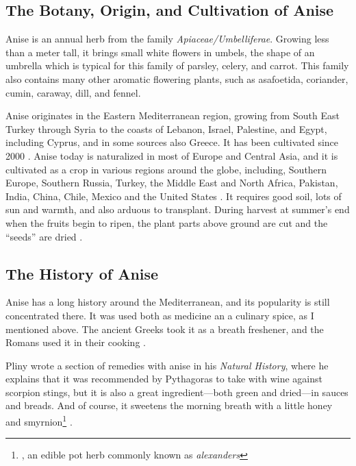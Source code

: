 \subsection{The Botany, Origin, and  Cultivation of Anise}

Anise is an annual herb from the family \textit{Apiaceae/Umbelliferae}. Growing less than a meter tall, it brings small white flowers in umbels, the shape of an umbrella which is typical for this family of parsley, celery, and carrot. This family also contains many other aromatic flowering plants, such as asa\-foetida, coriander, cumin, caraway, dill, and fennel.

Anise originates in the Eastern Mediterranean region, growing from South East Turkey through Syria to the coasts of Lebanon, Israel, Palestine, and Egypt, including Cyprus, and in some sources also Greece. It has been cultivated since 2000 \BC{} \autocite[718]{mabberley_mabberleys_2017}.
Anise today is naturalized in most of Europe and Central Asia, and it is cultivated as a crop in various regions around the globe, including, Southern Europe, Southern Russia, Turkey, the Middle East and North Africa, Pakistan, India, China, Chile, Mexico and the United States \autocite[32]{farrell_spices_1985}. It requires good soil, lots of sun and warmth, and also arduous to transplant. During harvest at summer's end when the fruits begin to ripen, the plant parts above ground are cut and the ``seeds'' are dried \autocite[212]{van_wyk_culinary_2014}.

\subsection{The History of Anise}

Anise has a long history around the Mediterranean, and its popularity is still concentrated there. It was used both as medicine an a culinary spice, as I mentioned above. The ancient Greeks took it as a breath freshener, and the Romans used it in their cooking \autocite{farrell_spices_1985}.

Pliny wrote a section of remedies with anise in his \textit{Natural History}, where he explains that it was recommended by Pythagoras to take with wine against scorpion stings, but it is also a great ingredient---both green and dried---in sauces and breads. And of course, it sweetens the morning breath with a little honey and smyrnion\footnote{, an edible pot herb commonly known as \textit{alexanders}} \autocite[20:72 ]{pliny_the_elder_natural_1855}.

